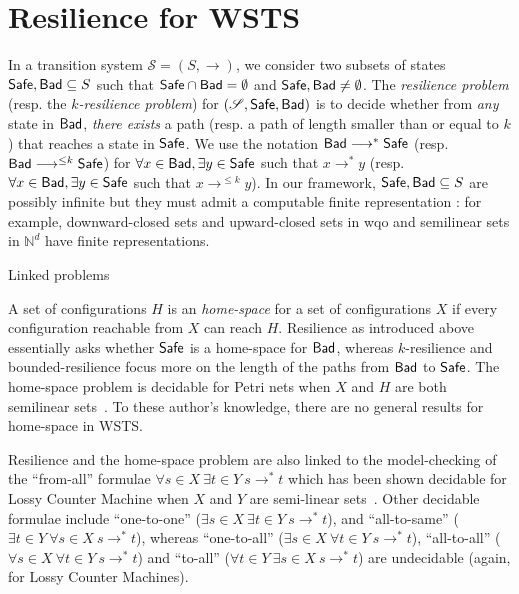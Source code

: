 
\section{Resilience for WSTS}


In a transition system $\mathscr{S}=(S,\rightarrow)$, we consider two subsets of states $\textsf{Safe}, \textsf{Bad} \subseteq S$ such that $\textsf{Safe} \cap  \textsf{Bad} = \emptyset$ and $\textsf{Safe} ,  \textsf{Bad} \neq \emptyset$.
The \emph{resilience problem} (resp. the \emph{$k$-resilience problem}) for $(\mathscr{S},\textsf{Safe},\textsf{Bad})$ is to decide whether from \emph{any} state in $\textsf{Bad}$, \emph{there exists} a path (resp. a path of length smaller than or equal to $k$) that reaches a state in $\textsf{Safe}$. We use the notation $\textsf{Bad} \longrightarrow^{*} \textsf{Safe}$ (resp. $\textsf{Bad} \longrightarrow^{\leq k} \textsf{Safe}$) for $\forall x \in \textsf{Bad}, \exists y \in \textsf{Safe}$ such that $x \longrightarrow^{*} y$ (resp.  $\forall x \in \textsf{Bad}, \exists y \in \textsf{Safe}$ such that $x \longrightarrow^{\leq k} y$). In our framework, $\textsf{Safe}, \textsf{Bad} \subseteq S$  are possibly infinite but they must admit a computable finite representation : for example, downward-closed sets and upward-closed sets in wqo and semilinear sets in $\mathbb{N}^d$ have finite representations. 



Linked problems

A set of configurations $H$ is an {\em home-space} for a set of configurations $X$ if every configuration reachable from $X$ can reach $H$. Resilience as introduced above essentially asks whether $\textsf{Safe}$ is a home-space for $\textsf{Bad}$, whereas $k$-resilience and bounded-resilience focus more on the length of the paths from $\textsf{Bad}$ to $\textsf{Safe}$. The home-space problem is decidable for
Petri nets when $X$ and $H$ are both semilinear sets~\cite{DBLP:journals/corr/abs-2207-02697}.
To these author's knowledge, there are no general results for home-space in WSTS.


Resilience and the home-space problem are also linked to the 
model-checking of the ``from-all'' formulae $\forall s \in X~ \exists t \in Y~ s \to^* t$
which has been shown decidable for Lossy Counter Machine
when $X$ and $Y$ are semi-linear sets~\cite{DBLP:conf/rp/Schnoebelen10}.
Other decidable formulae include ``one-to-one'' ($\exists s \in  X ~ \exists t \in  Y ~ s \to^* 
 t$), and ``all-to-same'' ($\exists t \in  Y ~ \forall s \in  X ~ s \to^*  t$),
whereas ``one-to-all'' ($\exists s \in  X ~ \forall t \in  Y ~ s \to^*  t$), 
``all-to-all'' ($\forall s \in  X ~ \forall t \in  Y ~ s \to^*  t$)
  and ``to-all'' ($\forall t \in  Y  ~ \exists s \in  X ~ s \to^*  t$) are undecidable (again, for Lossy Counter Machines). 
  
